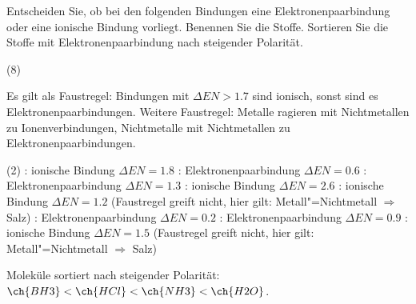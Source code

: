 \documentclass[DIV11]{scrartcl}
\begin{document}
\begin{question}[name=Bindungen I]
Entscheiden Sie, ob bei den folgenden Bindungen eine Elektronenpaarbindung
oder eine ionische Bindung vorliegt.  Benennen Sie die Stoffe.  Sortieren Sie
die Stoffe mit Elektronenpaarbindung nach steigender Polarität.
\begin{tasks}(8)
  \task {}
  \task {}
  \task {}
  \task {}
  \task {}
  \task {}
  \task {}
  \task {}
\end{tasks}
\end{question}
\begin{solution}[name=Bindungen I]
Es gilt als Faustregel: Bindungen mit $\Delta EN > 1.7$ sind ionisch, sonst
sind es Elektronenpaarbindungen. Weitere Faustregel: Metalle ragieren mit
Nichtmetallen zu Ionenverbindungen, Nichtmetalle mit Nichtmetallen zu
Elektronenpaarbindungen.
\begin{tasks}(2)
  \task {}: ionische Bindung $\Delta EN=1.8$
  \task {}: Elektronenpaarbindung $\Delta EN=0.6$
  \task {}: Elektronenpaarbindung $\Delta EN=1.3$
  \task {}: ionische Bindung $\Delta EN=2.6$
  \task {}: ionische Bindung $\Delta EN=1.2$ (Faustregel greift nicht,
    hier gilt: Metall"=Nichtmetall $\Rightarrow$ Salz)
  \task {}: Elektronenpaarbindung $\Delta EN=0.2$
  \task {}: Elektronenpaarbindung $\Delta EN=0.9$
  \task {}: ionische Bindung $\Delta EN=1.5$ (Faustregel greift nicht,
    hier gilt: Metall"=Nichtmetall $\Rightarrow$ Salz)
\end{tasks}
Moleküle sortiert nach steigender Polarität: $ \ch{BH3} < \ch{HCl} < \ch{NH3}
< \ch{H2O}$.
\end{solution}
\end{document}
